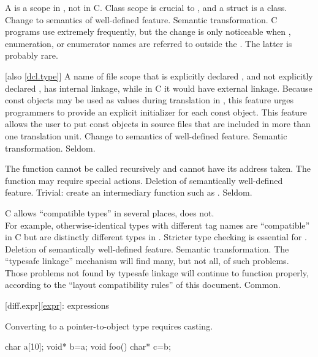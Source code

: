 \change
A  is a scope in \Cpp{}, not in C.
\rationale
Class scope is crucial to \Cpp{}, and a struct is a class.
\effect
Change to semantics of well-defined feature.
\difficulty
Semantic transformation.
\howwide
C programs use  extremely frequently, but the
change is only noticeable when , enumeration, or enumerator
names are referred to outside the .
The latter is probably rare.

 [also \ref{dcl.type}]
\change
A name of file scope that is explicitly declared , and not explicitly
declared , has internal linkage, while in C it would have external linkage.
\rationale
Because const objects may be used as values during translation in
\Cpp{}, this feature urges programmers to provide an explicit initializer
for each const object.
This feature allows the user to put const objects in source files that are included
in more than one translation unit.
\effect
Change to semantics of well-defined feature.
\difficulty
Semantic transformation.
\howwide
Seldom.

\change
The  function cannot be called recursively and cannot have its address taken.
\rationale
The  function may require special actions.
\effect
Deletion of semantically well-defined feature.
\difficulty
Trivial: create an intermediary function such as
.
\howwide
Seldom.

\change
C allows ``compatible types'' in several places, \Cpp{} does not.\\
For example,
otherwise-identical  types with different tag names
are ``compatible'' in C but are distinctly different types
in \Cpp{}.
\rationale
Stricter type checking is essential for \Cpp{}.
\effect
Deletion of semantically well-defined feature.
\difficulty
Semantic transformation.
The ``typesafe linkage'' mechanism will find many, but not all,
of such problems.
Those problems not found by typesafe linkage will continue to
function properly,
according to the ``layout compatibility rules'' of this
document.
\howwide
Common.

[diff.expr]{\ref{expr}: expressions}

\change
Converting  to a pointer-to-object type requires casting.

\begin{codeblock}
char a[10];
void* b=a;
void foo() {
  char* c=b;
}
\end{codeblock}

